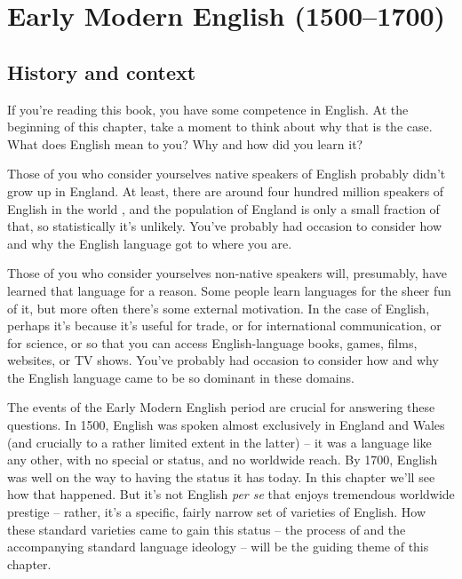 \chapter{Early Modern English (1500--1700)}\label{EModE}

\section{History and context}\label{EModE-history}

If you're reading this book, you have some competence in English. At the beginning of this chapter, take a moment to think about why that is the case. What does English mean to you? Why and how did you learn it?

Those of you who consider yourselves native speakers of English probably didn't grow up in England. At least, there are around four hundred million speakers of English in the world \citep{Crystal2006}, and the population of England is only a small fraction of that, so statistically it's unlikely. You've probably had occasion to consider how and why the English language got to where you are.

Those of you who consider yourselves non-native speakers will, presumably, have learned that language for a reason. Some people learn languages for the sheer fun of it, but more often there's some external motivation. In the case of English, perhaps it's because it's useful for trade, or for international communication, or for science, or so that you can access English-language books, games, films, websites, or TV shows. You've probably had occasion to consider how and why the English language came to be so dominant in these domains.

The events of the Early Modern English period are crucial for answering these questions. In 1500, English was spoken almost exclusively in England and Wales (and crucially to a rather limited extent in the latter) -- it was a language like any other, with no special  or status, and no worldwide reach. By 1700, English was well on the way to having the status it has today. In this chapter we'll see how that happened. But it's not English \textit{per se} that enjoys tremendous worldwide prestige -- rather, it's a specific, fairly narrow set of varieties of English. How these standard varieties came to gain this status -- the process of  and the accompanying standard language ideology -- will be the guiding theme of this chapter.

